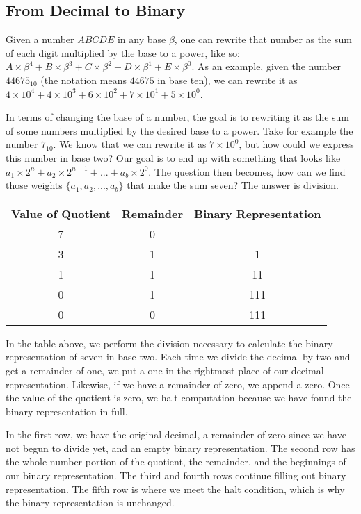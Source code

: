 \documentclass[12pt]{article}
\begin{document}
\subsection{From Decimal to Binary}
Given a number $ABCDE$ in any base $\beta$, one can rewrite that number as the sum of each digit multiplied by the base to a power, like so: $A\times\beta^4 + B\times\beta^3 + C\times\beta^2 + D\times\beta^1 + E\times\beta^0$. As an example, given the number $44675_{10}$ (the notation means $44675$ in base ten), we can rewrite it as $4\times10^4 + 4\times10^3 + 6\times10^2 + 7\times10^1 + 5\times10^0$.

\par In terms of changing the base of a number, the goal is to rewriting it as the sum of some numbers multiplied by the desired base to a power. Take for example the number $7_{10}$. We know that we can rewrite it as $7\times10^0$, but how could we express this number in base two? Our goal is to end up with something that looks like $a_1\times2^{n} + a_2\times2^{n-1} + ... + a_b\times2^0$. The question then becomes, how can we find those weights $\{a_1, a_2, ..., a_b\}$ that make the sum seven? The answer is division.

\begin{center}
\begin{tabular}{c|c|c}
  \textbf{Value of Quotient} & \textbf{Remainder} & \textbf{Binary Representation} \\
  7 & 0 & \\
  3 & 1 & 1 \\
  1 & 1 & 11 \\
  0 & 1 & 111 \\
  0 & 0 & 111
\end{tabular}
\end{center}

\par In the table above, we perform the division necessary to calculate the binary representation of seven in base two. Each time we divide the decimal by two and get a remainder of one, we put a one in the rightmost place of our decimal representation. Likewise, if we have a remainder of zero, we append a zero. Once the value of the quotient is zero, we halt computation because we have found the binary representation in full.

\par In the first row, we have the original decimal, a remainder of zero since we have not begun to divide yet, and an empty binary representation. The second row has the whole number portion of the quotient, the remainder, and the beginnings of our binary representation. The third and fourth rows continue filling out binary representation. The fifth row is where we meet the halt condition, which is why the binary representation is unchanged.
\end{document}

